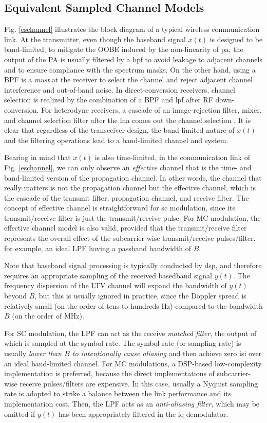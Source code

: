 \documentclass[journal]{IEEEtran}
\begin{document}
\subsection{Equivalent Sampled Channel Models}
Fig. \ref{eschannel} illustrates the block diagram of a typical wireless communication link. At the transmitter, even though the baseband signal $x(t)$ is designed to be band-limited, to mitigate the OOBE induced by the  non-linearity of \ac{pa}, the output of the PA is usually filtered by a \ac{bpf} to avoid leakage to adjacent channels and to ensure compliance with the spectrum masks.
On the other hand, using a BPF is a \emph{must} at the receiver to select the channel and reject adjacent channel interference and out-of-band noise. In direct-conversion receivers, channel selection is realized by the combination of a BPF and \ac{lpf} after RF down-conversion. For heterodyne receivers, a cascade of an image-rejection filter, mixer, and channel selection filter after the \ac{lna} comes out the channel selection \cite{rfme}. It is clear that regardless of the transceiver design, the band-limited nature of $x(t)$ and the filtering operations lead to a band-limited channel and system.

Bearing in mind that $x(t)$ is also time-limited, in the communication link of Fig. \ref{eschannel}, we can only observe an \emph{effective} channel that is the time- and band-limited version of the propagation channel. In other words, the channel that really matters is not the propagation channel but the effective channel, which is the cascade of the transmit filter, propagation channel, and receive filter. The concept of effective channel is straightforward for \ac{sc} modulation, since its transmit/receive filter is just the transmit/receive pulse. For MC modulation, the effective channel model is also valid, provided that the  transmit/receive filter represents the overall effect of the subcarrier-wise transmit/receive pulses/filter, for example, an ideal LPF having a passband bandwidth of $B$.

Note that baseband signal processing is typically conducted by \ac{dsp}, and therefore requires an appropriate sampling of the received basedband signal $y(t)$.
The frequency dispersion of the LTV channel will expand the bandwidth of $y(t)$ beyond $B$, but this is usually ignored in practice, since the Doppler spread is relatively small (on the order of tens to hundreds Hz) compared to the bandwidth $B$ (on the order of MHz)\cite{fwc}.

For SC modulation, the LPF can act as the receive \emph{matched filter}, the output of which is sampled at the symbol rate. The symbol rate (or sampling rate) is usually \emph{lower than $B$ to intentionally cause aliasing} and then achieve zero \ac{isi} over an ideal band-limited channel.
For MC modulations, a DSP-based low-complexity implementation is preferred, because the direct implementations of subcarrier-wise receive pulses/filters are expensive. In this case, usually a Nyquist sampling rate is adopted to strike a balance between the link performance and its implementation cost. Then, the LPF acts as an \emph{anti-aliasing filter}, which may be omitted if $y(t)$ has been appropriately filtered in the \ac{iq} demodulator.
\end{document}
